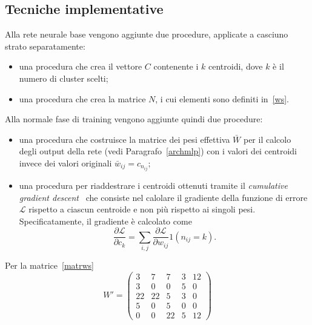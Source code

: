 \documentclass[11pt,a4paper,twoside,
openright]{book}
\begin{document}
\subsection{Tecniche implementative}
\label{implws}
Alla rete neurale base vengono aggiunte due procedure, applicate a casciuno strato separatamente:
\begin{itemize}
\item una procedura che crea il vettore $C$ contenente i $k$ centroidi, dove $k$ è il numero di cluster scelti;
\item una procedura che crea la matrice $N$, i cui elementi sono definiti in~\eqref{ws}.
\end{itemize}
Alla normale fase di training vengono aggiunte quindi due procedure:
\begin{itemize}
\item una procedura che costruisce la matrice dei pesi effettiva $\bar{W}$ per il calcolo degli output della rete (vedi Paragrafo~\ref{archmlp}) con i valori dei centroidi invece dei valori originali $\bar{w}_{ij} = c_{n_{ij}}$;
\item una procedura per riaddestrare i centroidi ottenuti tramite il \textit{cumulative gradient descent}~\cite{han2015compression} che consiste nel calolare il gradiente della funzione di errore $\mathcal{L}$ rispetto a ciascun centroide e non più rispetto ai singoli pesi. Specificatamente, il gradiente è calcolato come
\begin{equation}
\frac{\partial \mathcal{L}}{\partial c_{k}}=\sum\limits_{i,j}\frac{\partial \mathcal{L}}{\partial w_{ij}}1(n_{ij}=k).
\label{gradientews}
\end{equation}
\end{itemize}
Per la matrice~\ref{matrws}
\begin{equation}
W'=
\begin{pmatrix} 
3 & 7 & 7 & 3 & 12\\
3 & 0 & 0 & 5 & 0\\
22 & 22 & 5 & 3 & 0\\
5 & 0 & 5 & 0 & 0\\
0 & 0 & 22 & 5 & 12 
\end{pmatrix}
\label{wprimoes}
\end{equation}
\end{document}

